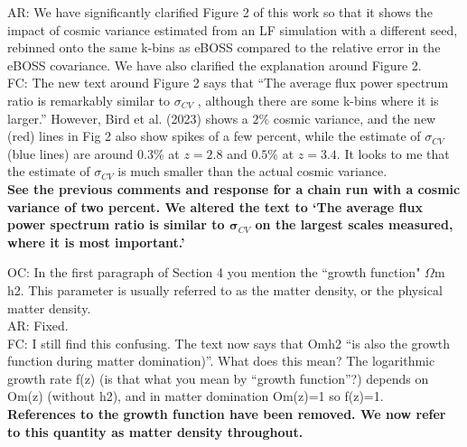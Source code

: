 \documentclass[12pt]{article}
\begin{document}
AR: We have significantly clarified Figure 2 of this work so that it shows the impact of cosmic variance estimated from an LF simulation with a different seed, rebinned onto the same k-bins as eBOSS compared to the relative error in the eBOSS covariance. We have also clarified the explanation around Figure 2.\\

FC: The new text around Figure 2 says that “The average flux power spectrum ratio is remarkably similar to $\sigma_{CV}$ , although there are some k-bins where it is larger.” However, Bird et al. (2023) shows a $2\%$ cosmic variance, and the new (red) lines in Fig 2 also show spikes of a few percent, while the estimate of $\sigma_{CV}$ (blue lines) are around $0.3\%$ at $z=2.8$ and $0.5\%$ at $z=3.4$. It looks to me that the estimate of $\sigma_{CV}$ is much smaller than the actual cosmic variance.\\

\textbf{See the previous comments and response for a chain run with a cosmic variance of two percent. We altered the text to `The average flux power spectrum ratio is similar to $\boldsymbol{\sigma}_{CV}$ on the largest scales measured, where it is most important.'}\\

\hrulefill \newline

OC: In the first paragraph of Section 4 you mention the “growth function" $\Omega$m h2. This parameter is usually referred to as the matter density, or the physical matter density.\\

AR: Fixed.\\

FC: I still find this confusing. The text now says that Omh2 “is also the growth function during matter domination)”. What does this mean? The logarithmic growth rate f(z) (is that what you mean by “growth function”?) depends on Om(z) (without h2), and in matter domination Om(z)=1 so f(z)=1.\\

\textbf{References to the growth function have been removed. We now refer to this quantity as matter density throughout.}\\

\hrulefill \newline
\end{document}

